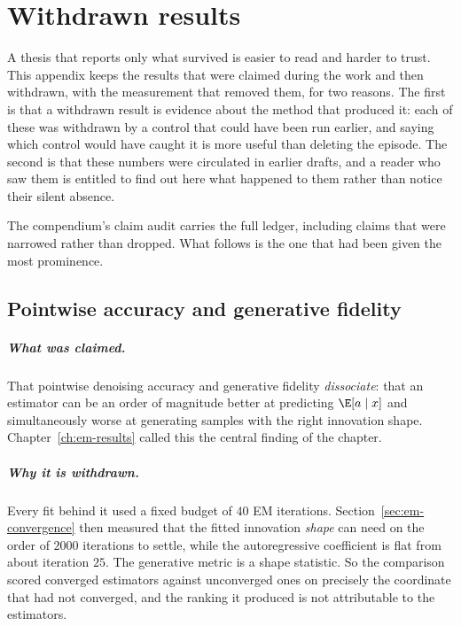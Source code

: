 \chapter{Withdrawn results}\label{app:withdrawn}

A thesis that reports only what survived is easier to read and harder to
trust. This appendix keeps the results that were claimed during the work and
then withdrawn, with the measurement that removed them, for two reasons. The
first is that a withdrawn result is evidence about the method that produced
it: each of these was withdrawn by a control that could have been run earlier,
and saying which control would have caught it is more useful than deleting the
episode. The second is that these numbers were circulated in earlier drafts,
and a reader who saw them is entitled to find out here what happened to them
rather than notice their silent absence.

The compendium's claim audit carries the full ledger, including claims that
were narrowed rather than dropped. What follows is the one that had been given
the most prominence.

\section{Pointwise accuracy and generative fidelity}
\label{app:withdrawn-generative}

\paragraph{What was claimed.} That pointwise denoising accuracy and generative
fidelity \emph{dissociate}: that an estimator can be an order of magnitude
better at predicting $\E[a \mid x]$ and simultaneously worse at generating
samples with the right innovation shape. Chapter~\ref{ch:em-results} called
this the central finding of the chapter.

\paragraph{Why it is withdrawn.} Every fit behind it used a fixed budget of
$40$ EM iterations. Section~\ref{sec:em-convergence} then measured that the
fitted innovation \emph{shape} can need on the order of $2000$ iterations to
settle, while the autoregressive coefficient is flat from about iteration
$25$. The generative metric is a shape statistic. So the comparison scored
converged estimators against unconverged ones on precisely the coordinate that
had not converged, and the ranking it produced is not attributable to the
estimators.

